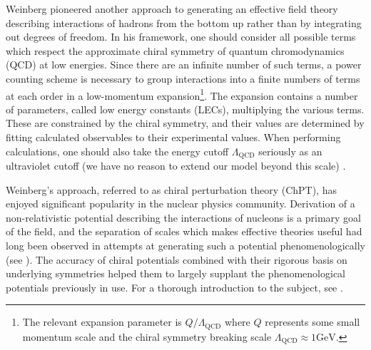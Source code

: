Weinberg pioneered another approach to generating an effective field theory describing interactions of hadrons \cite{WEINBERG1990288} from the bottom up rather than by integrating out degrees of freedom. In his framework, one should consider all possible terms which respect the approximate chiral symmetry of quantum chromodynamics (QCD) at low energies. Since there are an infinite number of such terms, a power counting scheme is necessary to group interactions into a finite numbers of terms at each order in a low-momentum expansion\footnote{The relevant expansion parameter is $Q/\Lambda_{\text{QCD}}$ where $Q$ represents some small momentum scale and the chiral symmetry breaking scale $\Lambda_{\text{QCD}}\approx 1\text{GeV}$.}. The expansion contains a number of parameters, called low energy constants (LECs), multiplying the various terms. These are constrained by the chiral symmetry, and their values are determined by fitting calculated observables to their experimental values. When performing calculations, one should also take the energy cutoff $\Lambda_{\text{QCD}}$ seriously as an ultraviolet cutoff (we have no reason to extend our model beyond this scale) \cite{Epelbaum2013}. 

Weinberg's approach, referred to as chiral perturbation theory (ChPT), has enjoyed significant popularity in the nuclear physics community. Derivation of a non-relativistic potential describing the interactions of nucleons is a primary goal of the field, and the separation of scales which makes effective theories useful had long been observed in attempts at generating such a potential phenomenologically (see ). The accuracy of chiral potentials combined with their rigorous basis on underlying symmetries helped them to largely supplant the phenomenological potentials previously in use. For a thorough introduction to the subject, see \cite{Machleidt20111}.

